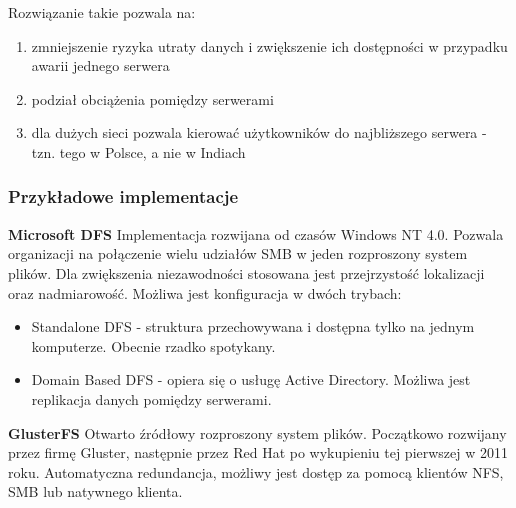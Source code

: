 Rozwiązanie takie pozwala na:
\begin{enumerate}
	\item zmniejszenie ryzyka utraty danych i zwiększenie ich dostępności w przypadku awarii jednego serwera
	\item podział obciążenia pomiędzy serwerami
	\item dla dużych sieci pozwala kierować użytkowników do najbliższego serwera - tzn. tego w Polsce, a nie w Indiach
\end{enumerate}

\subsubsection{Przykładowe implementacje}
\textbf{Microsoft DFS}
Implementacja rozwijana od czasów Windows NT 4.0. Pozwala organizacji na połączenie wielu udziałów SMB w jeden rozproszony system plików. Dla zwiększenia niezawodności stosowana jest przejrzystość lokalizacji oraz nadmiarowość. Możliwa jest konfiguracja w dwóch trybach:
\begin{itemize}
\item Standalone DFS - struktura przechowywana i dostępna tylko na jednym komputerze. Obecnie rzadko spotykany.
\item Domain Based DFS - opiera się o usługę Active Directory. Możliwa jest replikacja danych pomiędzy serwerami.
\end{itemize}

\textbf{GlusterFS}
Otwarto źródłowy rozproszony system plików. Początkowo rozwijany przez firmę Gluster, następnie przez Red Hat po wykupieniu tej pierwszej w 2011 roku. Automatyczna redundancja, możliwy jest dostęp za pomocą klientów NFS, SMB lub natywnego klienta.